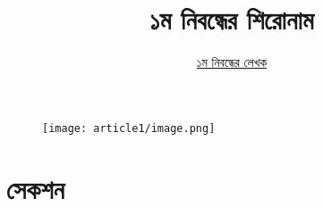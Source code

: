 \documentclass[12pt]{article}
\begin{document}
\begin{figure}[t]
        \centering 
        \texttt{[image: article1/image.png]}
\end{figure}

\title{১ম নিবন্ধের শিরোনাম}
\author{\href{https://github.com/rafisics/ebook-template}{১ম নিবন্ধের লেখক}}
\date{}


\section{সেকশন}

\lipsum



\end{document}
